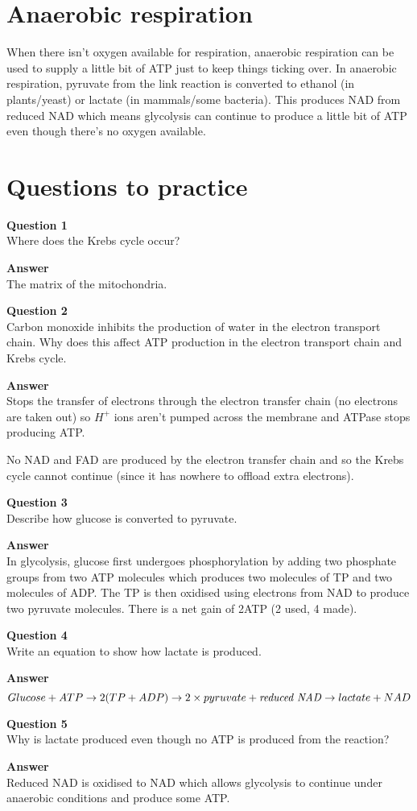 \documentclass{article}
\begin{document}
\section*{Anaerobic respiration}
When there isn't oxygen available for respiration, anaerobic respiration can be used to supply a little bit of ATP just to keep things ticking over. In anaerobic respiration, pyruvate from the link reaction is converted to ethanol (in plants/yeast) or lactate (in mammals/some bacteria). This produces NAD from reduced NAD which means glycolysis can continue to produce a little bit of ATP even though there's no oxygen available.

\section*{Questions to practice}
\textbf{Question 1}\\
Where does the Krebs cycle occur?

\textbf{Answer}\\
The matrix of the mitochondria.

\textbf{Question 2}\\
Carbon monoxide inhibits the production of water in the electron transport chain. Why does this affect ATP production in the electron transport chain and Krebs cycle.

\textbf{Answer}\\
Stops the transfer of electrons through the electron transfer chain (no electrons are taken out) so $H^+$ ions aren't pumped across the membrane and ATPase stops producing ATP.

No NAD and FAD are produced by the electron transfer chain and so the Krebs cycle cannot continue (since it has nowhere to offload extra electrons).

\textbf{Question 3}\\
Describe how glucose is converted to pyruvate.

\textbf{Answer}\\
In glycolysis, glucose first undergoes phosphorylation by adding two phosphate groups from two ATP molecules which produces two molecules of TP and two molecules of ADP. The TP is then oxidised using electrons from NAD to produce two pyruvate molecules. There is a net gain of 2ATP (2 used, 4 made).

\textbf{Question 4}\\
Write an equation to show how lactate is produced.

\textbf{Answer}\\
\[
	Glucose + ATP \rightarrow 2(TP + ADP) \rightarrow 2 \times pyruvate + \textrm{\textit{reduced NAD}} \rightarrow lactate + NAD
\]

\textbf{Question 5}\\
Why is lactate produced even though no ATP is produced from the reaction?

\textbf{Answer}\\
Reduced NAD is oxidised to NAD which allows glycolysis to continue under anaerobic conditions and produce some ATP.
\end{document}
